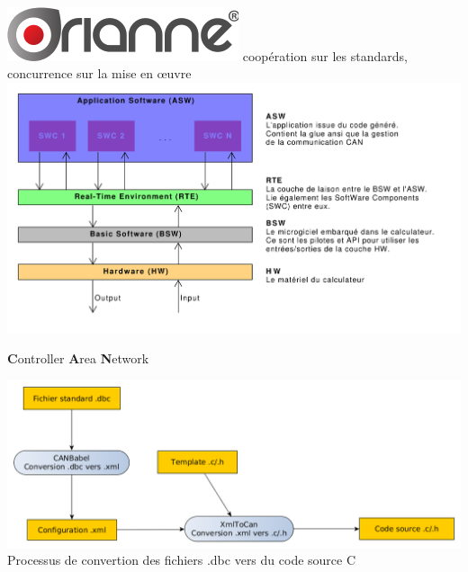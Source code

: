 \documentclass[xcolor=x11names,compress]{beamer}
\begin{document}
\begin{frame}{\vspace{-17pt}\\\includegraphics[scale=0.4]{images/orianne}}
  \centering
  \og coopération sur les standards,\\
  concurrence sur la mise en \oe uvre \fg{}
  \includegraphics[scale=0.37]{images/autosar_arch}
\end{frame}

\begin{frame}{{\bf C}ontroller {\bf A}rea {\bf N}etwork}
  \begin{center}
	\includegraphics[scale=0.28]{images/dbctocan}\\
	\vfill
	Processus de convertion des fichiers .dbc vers du code source C
  \end{center}
\end{frame}
\end{document}
